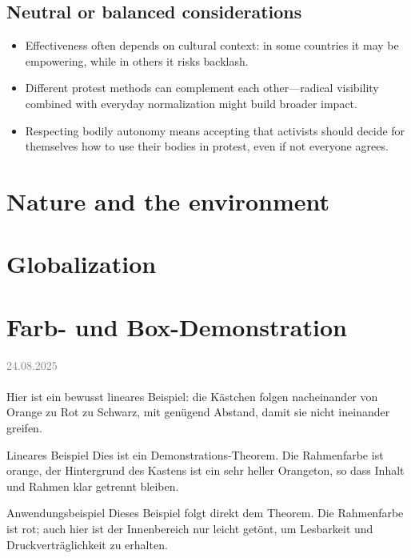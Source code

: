\documentclass[11pt,a4paper,oneside]{article}
\newcommand{\lessondate}[1]{
	\noindent\hfill\textcolor{gray}{\textsc{#1}} \\
	\vspace{0.5cm}
}
\begin{document}
	\subsection*{Neutral or balanced considerations}
	\begin{itemize}[leftmargin=*]
		\item Effectiveness often depends on cultural context: in some countries it may be empowering, while in others it risks backlash.  
		\item Different protest methods can complement each other—radical visibility combined with everyday normalization might build broader impact.  
		\item Respecting bodily autonomy means accepting that activists should decide for themselves how to use their bodies in protest, even if not everyone agrees.  
	\end{itemize}
	
	
	\newpage
	
	
	
	\section{Nature and the environment}
	\section{Globalization}
	
	
	\newpage
	
	
	\section{Farb- und Box-Demonstration}

	
	\lessondate{24.08.2025}\\
	Hier ist ein bewusst lineares Beispiel: die Kästchen folgen nacheinander von Orange zu Rot zu Schwarz, mit genügend Abstand, damit sie nicht ineinander greifen.
	
	\begin{theorem}{Lineares Beispiel}
		Dies ist ein Demonstrations-Theorem. Die Rahmenfarbe ist orange, der Hintergrund des Kastens ist ein sehr heller Orangeton, so dass Inhalt und Rahmen klar getrennt bleiben.
	\end{theorem}
	
	\begin{example}{Anwendungsbeispiel}
		Dieses Beispiel folgt direkt dem Theorem. Die Rahmenfarbe ist rot; auch hier ist der Innenbereich nur leicht getönt, um Lesbarkeit und Druckverträglichkeit zu erhalten.
	\end{example}
	
\end{document}
